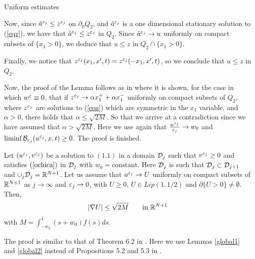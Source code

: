 \begin{section}{Uniform estimates}
\begin{pf}
Now, since $\tilde{a}^{\varepsilon_j}\le z^{\varepsilon_j}$ on $\partial_p Q_2$, and
$\tilde a^{{\varepsilon_j}}$ is a one dimensional stationary solution to (\ref{eqz}), we have that
$\tilde{a}^{\varepsilon_j}\le z^{\varepsilon_j}$ in $Q_2$. Since $\tilde{a}^{\varepsilon_j}\to u$ 
uniformly on compact subsets of $\{ x_1>0 \}$, we deduce that 
$u\le z$ in $Q_2\cap \{ x_1>0 \}$.

Finally, we notice that $z^{\varepsilon_j}(x_1,x',t) = z^{\varepsilon_j}(-x_1,x',t)$, so we 
conclude that $u\le z$ in $Q_2$.

\medskip

Now, the proof of the Lemma follows as in \cite{CLW1} where it is shown, for 
the case in which $w^{\varepsilon}\equiv 0$, that if $z^{{\varepsilon_j}}\to \alpha x_1^+
+\alpha x_1^-$  uniformly on compact subsets of $Q_2$, where $z^{{\varepsilon_j}}$ are
solutions to  (\ref{eqz}) which are symmetric in the $x_1$ variable, 
and $\alpha>0$, there holds that
$\alpha\le \sqrt{2M}$. So that we arrive at a contradiction since we have
assumed that $\alpha>\sqrt{2M}$. Here we use again that $\frac{w^{\varepsilon_j}}{{\varepsilon_j}}
\to w_0$ and  $\mbox{liminf}\,{\cal B}_{{\varepsilon_j}}(u^{\varepsilon_j},x,t)\ge0$. The proof is finished.
\end{pf}

\begin{lema}
\label{global3}
Let $(u^{\varepsilon_j},v^{\varepsilon_j})$ be a solution to $(1.1)$ in a domain ${{\cal D}}_j$ such that
$v^{\varepsilon_j}\ge0$ and
satisfies $(\ref{ochica})$ in ${{\cal D}}_j$ with $w_0=\mbox{constant}$.
Here ${{\cal D}}_j$ is such
that ${{\cal D}}_j\subset{\cal D}_{j+1}$ and $\cup_j{{\cal D}}_j={\Bbb R}^{N+1}$. Let us assume
that $u^{\varepsilon_j}\to U$ uniformly on compact subsets of ${{\Bbb R}}^{N+1}$ as $j\to\infty$
and ${\varepsilon_j}\to0$, with $U\ge0$,  $U\in Lip(1,1/2)$  and $\partial\{U>0\}\neq
\emptyset$.  Then,
\begin{equation}
|\nabla U|\le \sqrt{2M}\qquad\mbox{in }{\Bbb R}^{N+1}
\end{equation}
with $M=\int_{-w_0}^1(s+w_0)f(s)ds$.
\end{lema}

\begin{pf} The proof is similar to that of Theorem 6.2 in \cite{CLW1}. Here
we use Lemmas \ref{global1} and \ref{global2} instead of Propositions 5.2
and 5.3 in \cite{CLW1}.
\end{pf}



\end{section}

\bigskip

